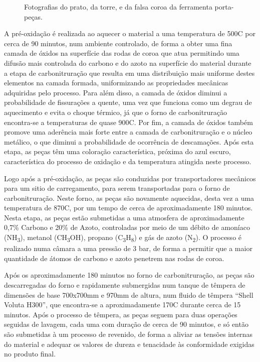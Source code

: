 \begin{figure}[htb]
\begin{subfigure}{.33\textwidth}
        \caption{}
        \label{fig:Falsa_coroa}
    \end{subfigure}
    \caption[Fotografias dos tres componentes da ferramenta porta-peças]%
    {Fotografias do prato, da torre, e da falsa coroa da ferramenta porta-peças.}
\end{figure}
\par
A pré-oxidação é realizada ao aquecer o material a uma temperatura de 500\textdegree C por cerca de 90 minutos, num ambiente controlado, de forma a obter uma fina camada de óxidos na superfície das rodas de coroa que atua permitindo uma difusão mais controlada do carbono e do azoto na superfície do material durante a etapa de carbonitruração que resulta em uma distribuição mais uniforme destes elementos na camada formada, uniformizando as propriedades mecânicas adquiridas pelo processo. Para além disso, a camada de óxidos diminui a probabilidade de fissurações a quente, uma vez que funciona como um degrau de aquecimento e evita o choque térmico, já que o forno de carbonitruração encontra-se a temperaturas de quase 900\textdegree C. Por fim, a camada de óxidos também promove uma aderência mais forte entre a camada de carbonitruração e o núcleo metálico, o que diminui a probabilidade de ocorrência de descamações. Após esta etapa, as peças têm uma coloração característica, próxima do azul escuro, característica do processo de oxidação e da temperatura atingida neste processo.
\par
Logo após a pré-oxidação, as peças são conduzidas por transportadores mecânicos para um sitio de carregamento, para serem transportadas para o forno de carbonitruração. Neste forno, as peças são novamente aquecidas, desta vez a uma temperatura de 870\textdegree C, por um tempo de cerca de aproximadamente 180 minutos. Nesta etapa, as peças estão submetidas a uma atmosfera de aproximadamente 0,7\% Carbono e 20\% de Azoto, controladas por meio de um débito de amoníaco (NH\textsubscript{3}), metanol (CH\textsubscript{3}OH), propano (C\textsubscript{3}H\textsubscript{8}) e gás de azoto (N\textsubscript{2}). O processo é realizado numa câmara a uma pressão de 3 bar, de forma a permitir que a maior quantidade de átomos de carbono e azoto penetrem nas rodas de coroa.
\par
Após os aproximadamente 180 minutos no forno de carbonitruração, as peças são descarregadas do forno e rapidamente submergidas num tanque de têmpera de dimensões de base 700x700mm e  970mm de altura, num fluido de têmpera “Shell Voluta H300”, que encontra-se a aproximadamente 170\textdegree C durante cerca de 15 minutos. Após o processo de têmpera, as peças seguem para duas operações seguidas de lavagem, cada uma com duração de cerca de 90 minutos, e só então são submetidas à um processo de revenido, de forma a aliviar as tensões internas do material e adequar os valores de dureza e tenacidade às conformidade exigidas no produto final.
